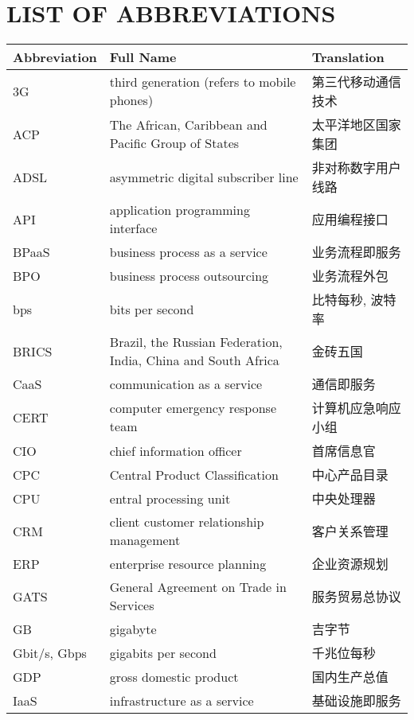 \documentclass[a4paper, UTF8, 12pt]{article}
\begin{document}
\section{LIST OF ABBREVIATIONS}
\begin{longtable}{lm{8cm}m{5cm}}
    \hline
    {\bfseries Abbreviation} & {\bfseries Full Name} & {\bfseries Translation}\\[5pt] \hline
    3G & third generation (refers to mobile phones) & 第三代移动通信技术 \\
    \hline
    ACP & The African, Caribbean and Pacific Group of States & 太平洋地区国家集团 \\
    \hline
    ADSL & asymmetric digital subscriber line & 非对称数字用户线路\\
    \hline
    API & application programming interface & 应用编程接口 \\
    \hline
    BPaaS & business process as a service & 业务流程即服务 \\
    \hline
    BPO & business process outsourcing & 业务流程外包 \\
    \hline
    bps & bits per second & 比特每秒, 波特率\\
    \hline
    BRICS & Brazil, the Russian Federation, India, China and South Africa & 金砖五国 \\
    \hline
    CaaS & communication as a service & 通信即服务\\
    \hline
    CERT & computer emergency response team & 计算机应急响应小组\\
    \hline
    CIO & chief information officer & 首席信息官\\
    \hline
    CPC & Central Product Classification & 中心产品目录\\
    \hline
    CPU & entral processing unit & 中央处理器\\
    \hline
    CRM & client customer relationship management & 客户关系管理\\
    \hline
    ERP & enterprise resource planning & 企业资源规划\\
    \hline
    GATS & General Agreement on Trade in Services & 服务贸易总协议\\
    \hline
    GB & gigabyte & 吉字节\\
    \hline
    Gbit/s, Gbps & gigabits per second & 千兆位每秒\\
    \hline
    GDP & gross domestic product & 国内生产总值\\
    \hline
    IaaS & infrastructure as a service & 基础设施即服务\\

\end{longtable}
\end{document}
